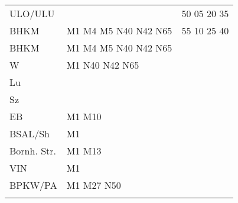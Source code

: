 \begin{tabular}{!{\color{schiefergrau}\vrule width 3pt}*{3}{l!{\color{schiefergrau}\vrule width 3pt}}}
ULO/ULU      & \nusechs{}                                                        & 50 05 20 35 \\
BHKM         & \nufuenf{} \nuacht{} \mtram{} M1 M4 M5 \nbus{} N40 N42 N65        & 55 10 25 40 \\
\hline
BHKM         & \nufuenf{} \nuacht{} \mtram{} M1 M4 M5 \nbus{} N40 N42 N65        & \\
W            & \nufuenf{} \nuacht{} \mtram{} M1 \nbus{} N40 N42 N65              & \\
Lu           &                                                                   & \\
Sz           &                                                                   & \\
EB           & \mtram{} M1 M10                                                   & \\
BSAL/Sh      & \mtram{} M1                                                       & \\
Bornh. Str.  & \mtram{} M1 M13                                                   & \\
VIN          & \mtram{} M1                                                       & \\
BPKW/PA      & \mtram{} M1 \mbus{} M27 \nbus{} N50                               & \\
\myhline
\end{tabular}

